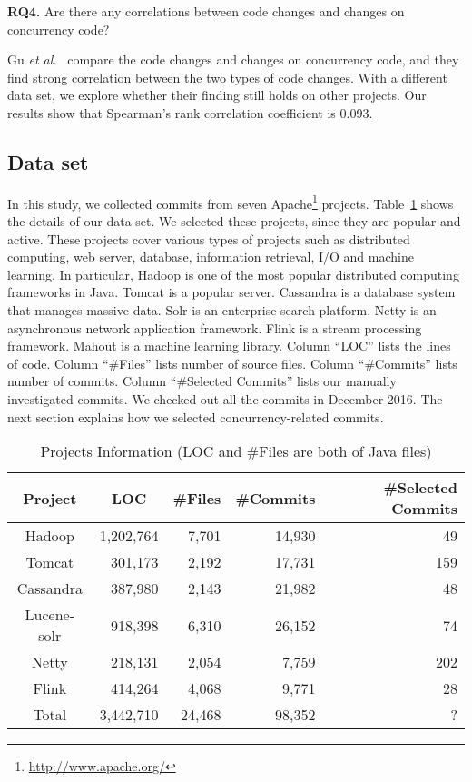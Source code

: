 \textbf{RQ4.} Are there any correlations between code changes and changes on concurrency code?

Gu \emph{et al.}~\cite{conf/sigsoft/GuJSZL15} compare the code changes and changes on concurrency code, and they find strong correlation between the two types of code changes. With a different data set, we explore whether their finding still holds on other projects. Our results show that Spearman's rank correlation coefficient is 0.093.

\subsection{Data set}
\label{sec:method:data}
In this study, we collected commits from seven Apache\footnote{\url{http://www.apache.org/}} projects. Table~\ref{table:dataset} shows the details of our data set. We selected these projects, since they are popular and active. These projects cover various types of projects such as distributed computing, web server, database, information retrieval, I/O and machine learning. In particular, Hadoop is one of the most popular distributed computing frameworks in Java. Tomcat is a popular server. Cassandra is a database system that manages massive data. Solr is an enterprise search platform. Netty is an asynchronous network application framework. Flink is a stream processing framework. Mahout is a machine learning library. Column ``LOC'' lists the lines of code. Column ``\#Files'' lists number of source files. Column ``\#Commits'' lists number of commits. Column ``\#Selected Commits'' lists our manually investigated commits. We checked out all the commits in December 2016. The next section explains how we selected concurrency-related commits.

\begin{table}
	\centering
	\caption{Projects Information (LOC and \#Files are both of Java files)}
    \label{table:dataset}
	\begin{tabular}{|c|r|r|r|r|}\hline
		Project&\multicolumn{1}{|c|}{LOC}&\#Files&\#Commits&\#Selected Commits\\\hline
		Hadoop&1,202,764&7,701&14,930&49\\
		Tomcat&301,173&2,192&17,731&159\\
		Cassandra&387,980&2,143&21,982&48\\
		Lucene-solr&918,398&6,310&26,152&74\\
		Netty&218,131&2,054&7,759&202\\
		Flink&414,264&4,068&9,771&28\\\hline
		Total&3,442,710&24,468&98,352&?\\\hline
	\end{tabular}
\end{table}

